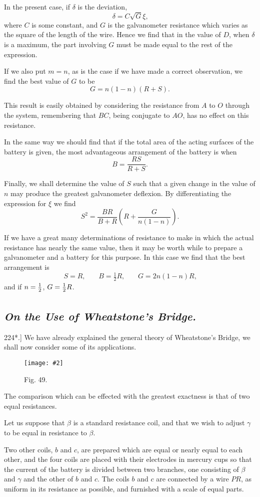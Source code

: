 \documentclass[12pt,oneside]{book}[2021/10/04]
\newcommand{\Heading}{\centering\normalfont}
\newcommand{\Subsection}[1]{\subsection*{\normalsize\Heading\itshape #1}}
\newcommand{\Runhead}[1]{\fancyhead[C]{\iffloatpage{}{\small#1}}}
\newcommand{\article}[1]{\phantomsection \label{art:#1}{#1.]}}
\newcommand{\tstrut}{\rule[-1.5ex]{0pt}{4.2ex}}
\newcommand{\widefig}[3]{
\begin{figure}[ht!]
\centering
\texttt{[image: \#2]}
\caption*{\small #3}
\end{figure}}
\newcommand{\¬}{\hphantom{0}}
\begin{document}
In the present case, if \(\delta\) is the deviation,
\[
\delta = C \sqrt{G} \xi\text{,}
\]
where \(C\) is some constant, and \(G\) is the galvanometer resistance
which varies as the square of the length of the wire. Hence we
find that in the value of \(D\), when \(\delta\) is a maximum, the part involving
\(G\) must be made equal to the rest of the expression.

If we also put \(m = n\), as is the case if we have made a correct
observation, we find the best value of \(G\) to be
\[
G = n(1 - n)(R + S)\text{.}
\]

This result is easily obtained by considering the resistance from
\(A\) to \(O\) through the system, remembering that \(BC\), being conjugate
to \(AO\), has no effect on this resistance.

In the same way we should find that if the total area of the
acting surfaces of the battery is given, the most advantageous arrangement
of the battery is when
\[
B =\frac{RS}{R + S}\text{.}
\]

Finally, we shall determine the value of \(S\) such that a given
change in the value of \(n\) may produce the greatest galvanometer
deflexion. By differentiating the expression for \(\xi\) we find
\[
S^2 = \frac{BR}{B + R}\left(R +\frac{G}{n(1 - n)}\right)\text{.}
\]

If we have a great many determinations of resistance to make
in which the actual resistance has nearly the same value, then it
may be worth while to prepare a galvanometer and a battery for
this purpose. In this case we find that the best arrangement is
\[
S = R\text{,}\qquad B = \tfrac{1}{2} R\text{,}\qquad G = 2n(1-n)R\text{,}
\]
and if \(n = \tstrut\frac{1}{2}\),  \(G = \tstrut\frac{1}{2} R\).

\Subsection{On the Use of Wheatstone's Bridge.}

\article{224*} We have already explained the general theory of Wheatstone's
Bridge, we shall now consider some of its applications.

\widefig{0.57}{208.png}{Fig. 49.}
The comparison which can be effected with the greatest exactness
is that of two equal resistances.
\Runhead{USE OF WHEATSTONE'S BRIDGE.}

Let us suppose that \(\beta\) is a standard resistance coil, and that we
wish to adjust \(\gamma\) to be equal in resistance to \(\beta\).

Two other coils, \(b\) and \(c\), are prepared which are equal or nearly
equal to each other, and the four coils are placed with their electrodes
in mercury cups so that the current of the battery is divided
between two branches, one consisting of \(\beta\) and \(\gamma\) and the other
of \(b\) and \(c\). The coils \(b\) and \(c\) are connected by a wire \(PR\), as
uniform in its resistance as possible, and furnished with a scale of
equal parts.
\end{document}
